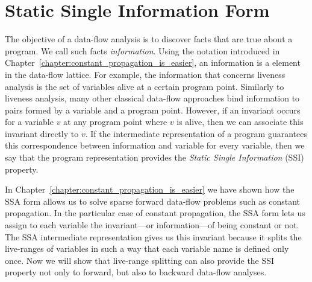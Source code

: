 \chapter{Static Single Information Form }
\label{chapter:ssi}

{
\def\progpoint{program point\xspace}
\def\progpoints{program points\xspace}
\def\splitpoint{control-flow point\xspace}
\def\splitpoints{control-flow points\xspace}
\def\psplit{\emph{Split}\xspace}
\def\pinfo{\emph{Info}\xspace}
\def\plink{\emph{Link}\xspace}
\def\pversion{\emph{Version}\xspace}

\label{sec:ssi:pereira:intro}

The objective of a data-flow analysis is to discover facts that are true about a
program.
We call such facts {\em information}.
Using the notation introduced in 
Chapter~\ref{chapter:constant_propagation_is_easier}, an
information is a element in the data-flow lattice.
For example, the information that concerns liveness analysis is the set of
variables alive at a certain \progpoint.
Similarly to liveness analysis, many other classical data-flow approaches bind
information to pairs formed by a variable and a \progpoint.
However, if an invariant occurs for a variable $v$ at any \progpoint where
$v$ is alive, then we can associate this invariant directly to $v$.
If the intermediate representation of a program guarantees this correspondence 
between
information and variable for every variable, then we say that the program
representation provides the {\em Static Single Information} (SSI) property.

In Chapter~\ref{chapter:constant_propagation_is_easier} we have shown how the 
SSA form allows us to solve sparse forward data-flow problems such as constant 
propagation.
In the particular case of constant propagation, the SSA form lets us assign to 
each variable the invariant---or information---of being constant or not.
The SSA intermediate representation gives us this invariant because it splits 
the live-ranges of variables in such a way that each variable name is defined 
only once.
Now we will show that live-range splitting can also provide the SSI property not only to forward, but also to backward data-flow analyses.

}
